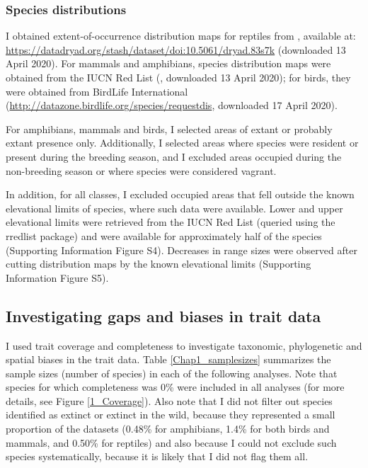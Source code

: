 \subsubsection{Species distributions}
I obtained extent-of-occurrence distribution maps for reptiles from \citet{Roll2017}, available at: \url{https://datadryad.org/stash/dataset/doi:10.5061/dryad.83s7k} (downloaded 13 April 2020). For mammals and amphibians, species distribution maps were obtained from the IUCN Red List (\citet{IUCN2020}, downloaded 13 April 2020); for birds, they were obtained from BirdLife International (\url{http://datazone.birdlife.org/species/requestdis}, downloaded 17 April 2020).

For amphibians, mammals and birds, I selected areas of extant or probably extant presence only. Additionally, I selected areas where species were resident or present during the breeding season, and I excluded areas occupied during the non-breeding season or where species were considered vagrant.

In addition, for all classes, I excluded occupied areas that fell outside the known elevational limits of species, where such data were available. Lower and upper elevational limits were retrieved from the IUCN Red List (queried using the rredlist package) and were available for approximately half of the species (Supporting Information Figure S4). Decreases in range sizes were observed after cutting distribution maps by the known elevational limits (Supporting Information Figure S5).

\subsection{Investigating gaps and biases in trait data}

I used trait coverage and completeness to investigate taxonomic, phylogenetic and spatial biases in the trait data. Table \ref{Chap1_samplesizes} summarizes the sample sizes (number of species) in each of the following analyses. Note that species for which completeness was 0\% were included in all analyses (for more details, see Figure \ref{1_Coverage}). Also note that I did not filter out species identified as extinct or extinct in the wild, because they represented a small proportion of the datasets (0.48\% for amphibians, 1.4\% for both birds and mammals, and 0.50\% for reptiles) and also because I could not exclude such species systematically, because it is likely that I did not flag them all.

